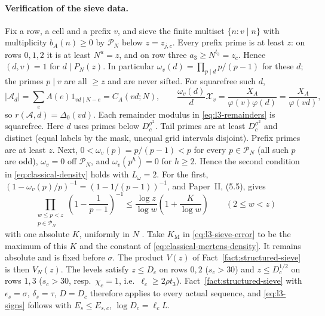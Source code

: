 \paragraph{Verification of the sieve data.}
Fix a row, a cell and a prefix $v$, and sieve the finite multiset
$\{n:v\mid n\}$ with multiplicity $b_A(n)\ge0$ by $\mathcal P_N$ below
$z=z_{j,c}$. Every prefix prime is at least $z$: on rows $0,1,2$ it is at
least $N^u=z$, and on row three $a_3\ge N^{t_3}=z_c$. Hence $(d,v)=1$
for $d\mid P_N(z)$. In particular $\omega_v(d)=\prod_{p\mid d}p/(p-1)$
for these $d$; the primes $p\mid v$ are all $\ge z$ and are never sifted.
For squarefree such $d$,
\[
 |\mathcal A_d|=\sum_eA(e)1_{vd\mid N-e}=C_A(vd;N),\qquad
 \frac{\omega_v(d)}d\mathcal X_v=\frac{X_A}{\varphi(v)\varphi(d)}
                               =\frac{X_A}{\varphi(vd)},
\]
so $r(\mathcal A,d)=\Delta_0(vd)$. Each remainder modulus in
\eqref{eq:l3-remainders} is squarefree. Here $d$ uses primes below
$D_c^{\sigma^2}$. Tail primes are at least $D_c^{\sigma^2}$ and distinct
(equal labels by the mask, unequal grid intervals disjoint). Prefix
primes are at least $z$. Next, $0<\omega_v(p)=p/(p-1)<p$ for every
$p\in\mathcal P_N$ (all such $p$ are odd),
$\omega_v=0$ off $\mathcal P_N$, and $\omega_v(p^h)=0$ for $h\ge2$. Hence the
second condition in \eqref{eq:classical-density} holds with $L_\omega=2$.
For the first, $(1-\omega_v(p)/p)^{-1}=(1-1/(p-1))^{-1}$, and Paper~II,
(5.5), gives
\[
 \prod_{\substack{w\le p<z\\p\in\mathcal P_N}}\left(1-\frac1{p-1}\right)^{-1}
 \le\frac{\log z}{\log w}\left(1+\frac{K}{\log w}\right)\qquad(2\le w<z)
\]
with one absolute $K$, uniformly in $N$ \cite[(5.5)]{PaperII}.
Take $K_{\mathrm M}$ in \eqref{eq:l3-sieve-error} to be the maximum of
this $K$ and the constant of \eqref{eq:classical-mertens-density}. It
remains absolute and is fixed before $\sigma$. The product
$V(z)$ of Fact~\ref{fact:structured-sieve} is then $V_N(z)$.
The levels satisfy $z\le D_c$ on rows $0,2$ ($s_c>30$) and
$z\le D_c^{1/2}$ on rows $1,3$ ($s_c>30$, resp.\ $\chi_c=1$, i.e.\
$\ell_c\ge2\rho t_3$). Fact~\ref{fact:structured-sieve} with
$\epsilon_s=\sigma$, $\delta_s=\tau$, $D=D_c$ therefore applies to every
actual sequence, and \eqref{eq:l3-signs} follows with
$E_s\le E_{s,c}$, $\log D_c=\ell_cL$.

